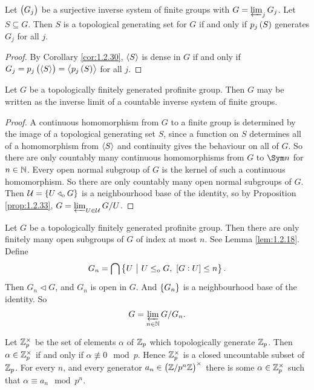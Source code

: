 \begin{proposition}
Let $ \br{G_j} $ be a surjective inverse system of finite groups with $ G = \varprojlim_j G_j $. Let $ S \subseteq G $. Then $ S $ is a topological generating set for $ G $ if and only if $ p_j\br{S} $ generates $ G_j $ for all $ j $.
\end{proposition}

\begin{proof}
By Corollary \ref{cor:1.2.30}, $ \left\langle S \right\rangle $ is dense in $ G $ if and only if $ G_j = p_j\br{\abr{S}} = \abr{p_j\br{S}} $ for all $ j $.
\end{proof}

\begin{lemma}
Let $ G $ be a topologically finitely generated profinite group. Then $ G $ may be written as the inverse limit of a countable inverse system of finite groups.
\end{lemma}

\begin{proof}
A continuous homomorphism from $ G $ to a finite group is determined by the image of a topological generating set $ S $, since a function on $ S $ determines all of a homomorphism from $ \left\langle S \right\rangle $ and continuity gives the behaviour on all of $ G $. So there are only countably many continuous homomorphisms from $ G $ to $ \Sym n $ for $ n \in \mathbb{N} $. Every open normal subgroup of $ G $ is the kernel of such a continuous homomorphism. So there are only countably many open normal subgroups of $ G $. Then $ \UUU = \cbr{U \triangleleft_\o G} $ is a neighbourhood base of the identity, so by Proposition \ref{prop:1.2.33}, $ G = \varprojlim_{U \in \mathcal{U}} G / U $.
\end{proof}

\begin{example}
\label{eg:2.5.9}
Let $ G $ be a topologically finitely generated profinite group. Then there are only finitely many open subgroups of $ G $ of index at most $ n $. See Lemma \ref{lem:1.2.18}. Define
$$ G_n = \bigcap \cbr{U \st U \le_\o G, \ \sbr{G : U} \le n}. $$
Then $ G_n \triangleleft G $, and $ G_n $ is open in $ G $. And $ \cbr{G_n} $ is a neighbourhood base of the identity. So
$$ G = \varprojlim_{n \in \mathbb{N}} G / G_n. $$
\end{example}

\begin{proposition}
\label{prop:2.5.10}
Let $ \mathbb{Z}_p^\times $ be the set of elements $ \alpha $ of $ \mathbb{Z}_p $ which topologically generate $ \mathbb{Z}_p $. Then $ \alpha \in \mathbb{Z}_p^\times $ if and only if $ \alpha \not\equiv 0 \mod p $. Hence $ \mathbb{Z}_p^\times $ is a closed uncountable subset of $ \mathbb{Z}_p $. For every $ n $, and every generator $ a_n \in \br{\ZZ / p^n\ZZ}^\times $ there is some $ \alpha \in \mathbb{Z}_p^\times $ such that $ \alpha \equiv a_n \mod p^n $.
\end{proposition}

